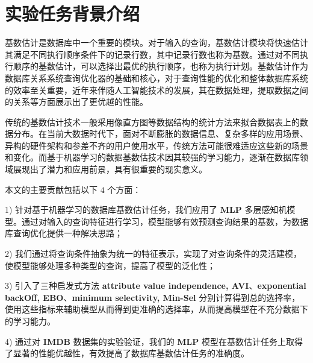 \section{实验任务背景介绍}
    \fontsize{10.5pt}{12.6pt}\selectfont
    \songti
    \par 基数估计是数据库中一个重要的模块。对于输入的查询，基数估计模块将快速估计其满足不同执行顺序条件下的记录行数，其中记录行数也称为基数。通过对不同执行顺序的基数估计，可以选择出最优的执行顺序，也称为执行计划。基数估计作为数据库关系系统查询优化器的基础和核心，对于查询性能的优化和整体数据库系统的效率至关重要，近年来伴随人工智能技术的发展，其在数据处理，提取数据之间的关系等方面展示出了更优越的性能。
    \par 传统的基数估计技术一般采用像直方图等数据结构的统计方法来拟合数据表上的数据分布\cite{ref1}。在当前大数据时代下，面对不断膨胀的数据信息、复杂多样的应用场景、异构的硬件架构和参差不齐的用户使用水平，传统方法可能很难适应这些新的场景和变化。而基于机器学习的数据基数估技术因其较强的学习能力，逐渐在数据库领域展现出了潜力和应用前景\cite{ref2}，具有很重要的现实意义。
    \par 本文的主要贡献包括以下 $4$ 个方面：
    \par 1) 针对基于机器学习的数据库基数估计任务，我们应用了 \textbf{MLP} 多层感知机模型。通过对输入的查询特征进行学习，模型能够有效预测查询结果的基数，为数据库查询优化提供一种解决思路；
    \par 2) 我们通过将查询条件抽象为统一的特征表示，实现了对查询条件的灵活建模，使模型能够处理多种类型的查询，提高了模型的泛化性；
    \par 3) 引入了三种启发式方法 \textbf{attribute value independence, AVI}、\textbf{exponential backOff, EBO}、\textbf{minimum selectivity, Min-Sel} 分别计算得到总的选择率，使用这些指标来辅助模型从而得到更准确的选择率，从而提高模型在不充分数据下的学习能力。
    \par 4) 通过对 \textbf{IMDB} 数据集的实验验证，我们的 \textbf{MLP} 模型在基数估计任务上取得了显著的性能优越性，有效提高了数据库基数估计任务的准确度。

